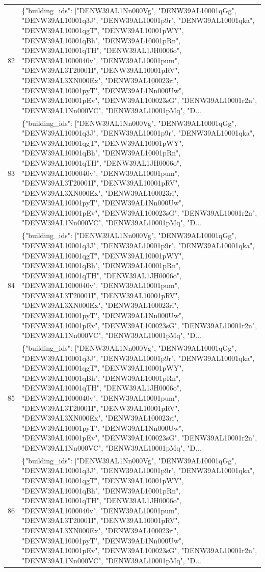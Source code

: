 \documentclass[a4paper,11pt]{article}
\begin{document}
\begin{table}[ht]
\begin{tabular}{r p{12cm}}
82 & \{"building\_ids": ["DENW39AL1Nn000Vg", "DENW39AL10001qGg", "DENW39AL10001q3J", "DENW39AL10001p9r", "DENW39AL10001qka", "DENW39AL10001qgT", "DENW39AL10001pWY", "DENW39AL10001qBh", "DENW39AL10001pRn", "DENW39AL10001qTH", "DENW39AL1JH0006o", "DENW39AL1000040v", "DENW39AL10001pum", "DENW39AL3T20001I", "DENW39AL10001pRV", "DENW39AL3XN000Ex", "DENW39AL100023ri", "DENW39AL10001pyT", "DENW39AL1Nn000Uw", "DENW39AL10001pEv", "DENW39AL100023sG", "DENW39AL10001r2n", "DENW39AL1Nn000VC", "DENW39AL10001pMq", "D... \\
83 & \{"building\_ids": ["DENW39AL1Nn000Vg", "DENW39AL10001qGg", "DENW39AL10001q3J", "DENW39AL10001p9r", "DENW39AL10001qka", "DENW39AL10001qgT", "DENW39AL10001pWY", "DENW39AL10001qBh", "DENW39AL10001pRn", "DENW39AL10001qTH", "DENW39AL1JH0006o", "DENW39AL1000040v", "DENW39AL10001pum", "DENW39AL3T20001I", "DENW39AL10001pRV", "DENW39AL3XN000Ex", "DENW39AL100023ri", "DENW39AL10001pyT", "DENW39AL1Nn000Uw", "DENW39AL10001pEv", "DENW39AL100023sG", "DENW39AL10001r2n", "DENW39AL1Nn000VC", "DENW39AL10001pMq", "D... \\
84 & \{"building\_ids": ["DENW39AL1Nn000Vg", "DENW39AL10001qGg", "DENW39AL10001q3J", "DENW39AL10001p9r", "DENW39AL10001qka", "DENW39AL10001qgT", "DENW39AL10001pWY", "DENW39AL10001qBh", "DENW39AL10001pRn", "DENW39AL10001qTH", "DENW39AL1JH0006o", "DENW39AL1000040v", "DENW39AL10001pum", "DENW39AL3T20001I", "DENW39AL10001pRV", "DENW39AL3XN000Ex", "DENW39AL100023ri", "DENW39AL10001pyT", "DENW39AL1Nn000Uw", "DENW39AL10001pEv", "DENW39AL100023sG", "DENW39AL10001r2n", "DENW39AL1Nn000VC", "DENW39AL10001pMq", "D... \\
85 & \{"building\_ids": ["DENW39AL1Nn000Vg", "DENW39AL10001qGg", "DENW39AL10001q3J", "DENW39AL10001p9r", "DENW39AL10001qka", "DENW39AL10001qgT", "DENW39AL10001pWY", "DENW39AL10001qBh", "DENW39AL10001pRn", "DENW39AL10001qTH", "DENW39AL1JH0006o", "DENW39AL1000040v", "DENW39AL10001pum", "DENW39AL3T20001I", "DENW39AL10001pRV", "DENW39AL3XN000Ex", "DENW39AL100023ri", "DENW39AL10001pyT", "DENW39AL1Nn000Uw", "DENW39AL10001pEv", "DENW39AL100023sG", "DENW39AL10001r2n", "DENW39AL1Nn000VC", "DENW39AL10001pMq", "D... \\
86 & \{"building\_ids": ["DENW39AL1Nn000Vg", "DENW39AL10001qGg", "DENW39AL10001q3J", "DENW39AL10001p9r", "DENW39AL10001qka", "DENW39AL10001qgT", "DENW39AL10001pWY", "DENW39AL10001qBh", "DENW39AL10001pRn", "DENW39AL10001qTH", "DENW39AL1JH0006o", "DENW39AL1000040v", "DENW39AL10001pum", "DENW39AL3T20001I", "DENW39AL10001pRV", "DENW39AL3XN000Ex", "DENW39AL100023ri", "DENW39AL10001pyT", "DENW39AL1Nn000Uw", "DENW39AL10001pEv", "DENW39AL100023sG", "DENW39AL10001r2n", "DENW39AL1Nn000VC", "DENW39AL10001pMq", "D... \\

\end{tabular}
\end{table}
\end{document}
